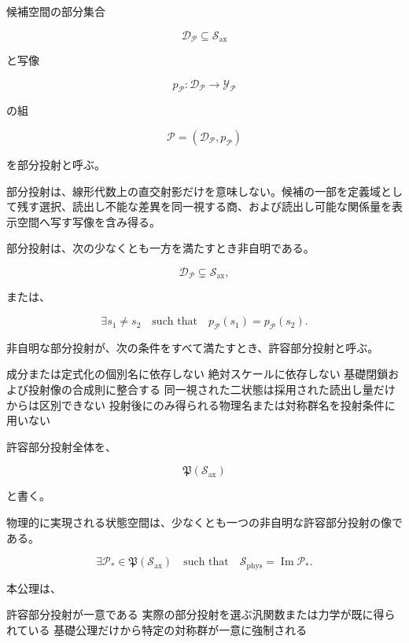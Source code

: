 \documentclass[
  a4paper,
]{ltjsarticle}
\newenvironment{Shaded}{}{}
\newcommand{\NormalTok}[1]{#1}
\begin{document}
候補空間の部分集合

\[
\mathscr D_{\mathcal P}
\subseteq
\mathscr S_{\mathrm{ax}}
\]

と写像

\[
p_{\mathcal P}:
\mathscr D_{\mathcal P}
\longrightarrow
\mathscr Y_{\mathcal P}
\]

の組

\[
\mathcal P
=
\left(
\mathscr D_{\mathcal P},
p_{\mathcal P}
\right)
\]

を部分投射と呼ぶ。

部分投射は、線形代数上の直交射影だけを意味しない。候補の一部を定義域として残す選択、読出し不能な差異を同一視する商、および読出し可能な関係量を表示空間へ写す写像を含み得る。

部分投射は、次の少なくとも一方を満たすとき非自明である。

\[
\mathscr D_{\mathcal P}
\subsetneq
\mathscr S_{\mathrm{ax}},
\]

または、

\[
\exists s_1\ne s_2
\quad\text{such that}\quad
p_{\mathcal P}(s_1)
=
p_{\mathcal P}(s_2).
\]

非自明な部分投射が、次の条件をすべて満たすとき、許容部分投射と呼ぶ。

\begin{Shaded}
\begin{Highlighting}[]
\NormalTok{成分または定式化の個別名に依存しない}
\NormalTok{絶対スケールに依存しない}
\NormalTok{基礎閉鎖および投射像の合成則に整合する}
\NormalTok{同一視された二状態は採用された読出し量だけからは区別できない}
\NormalTok{投射後にのみ得られる物理名または対称群名を投射条件に用いない}
\end{Highlighting}
\end{Shaded}

許容部分投射全体を、

\[
\mathfrak P(\mathscr S_{\mathrm{ax}})
\]

と書く。

物理的に実現される状態空間は、少なくとも一つの非自明な許容部分投射の像である。

\[
\boxed{
\exists\mathcal P_*
\in
\mathfrak P(\mathscr S_{\mathrm{ax}})
\quad\text{such that}\quad
\mathscr S_{\mathrm{phys}}
=
\operatorname{Im}\mathcal P_*.
}
\]

本公理は、

\begin{Shaded}
\begin{Highlighting}[]
\NormalTok{許容部分投射が一意である}
\NormalTok{実際の部分投射を選ぶ汎関数または力学が既に得られている}
\NormalTok{基礎公理だけから特定の対称群が一意に強制される}
\end{Highlighting}
\end{Shaded}
\end{document}
